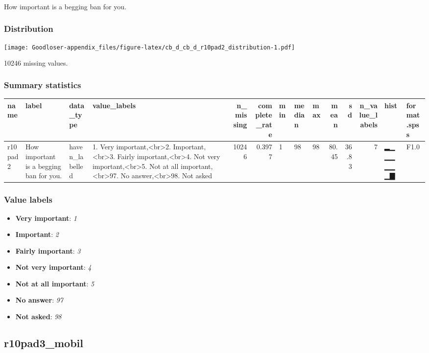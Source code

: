 \documentclass[
]{book}
\providecommand{\tightlist}{%
  \setlength{\itemsep}{0pt}\setlength{\parskip}{0pt}}
\begin{document}
How important is a begging ban for you.

\hypertarget{r10pad2_distribution}{%
\subsubsection{Distribution}\label{r10pad2_distribution}}

\texttt{[image: Goodloser-appendix\_files/figure-latex/cb\_d\_cb\_d\_r10pad2\_distribution-1.pdf]}

10246 missing values.

\hypertarget{r10pad2_summary}{%
\subsubsection{Summary statistics}\label{r10pad2_summary}}

\begin{tabular}{l|l|l|l|r|r|l|l|l|r|r|r|l|l}
\hline
name & label & data_type & value_labels & n_missing & complete_rate & min & median & max & mean & sd & n_value_labels & hist & format.spss\\
\hline
r10pad2 & How important is a begging ban for you. & haven_labelled & 1. Very important,<br>2. Important,<br>3. Fairly important,<br>4. Not very important,<br>5. Not at all important,<br>97. No answer,<br>98. Not asked & 10246 & 0.3977 & 1 & 98 & 98 & 80.45 & 36.83 & 7 & ▂▁▁▁▁▁▁▇ & F1.0\\
\hline
\end{tabular}

\hypertarget{r10pad2_labels}{%
\subsubsection{Value labels}\label{r10pad2_labels}}

\begin{itemize}
\tightlist
\item
  \textbf{Very important}: \emph{1}
\item
  \textbf{Important}: \emph{2}
\item
  \textbf{Fairly important}: \emph{3}
\item
  \textbf{Not very important}: \emph{4}
\item
  \textbf{Not at all important}: \emph{5}
\item
  \textbf{No answer}: \emph{97}
\item
  \textbf{Not asked}: \emph{98}
\end{itemize}

\hypertarget{r10pad3_mobil}{%
\subsection{r10pad3\_mobil}\label{r10pad3_mobil}}
\end{document}
